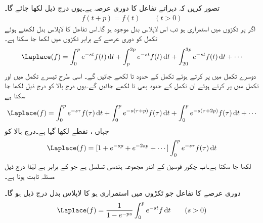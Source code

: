 تصور کریں کہ دہراتے تفاعل  کا دوری عرصہ  ہے۔یوں درج ذیل لکھا جائے گا۔
\begin{align}
f(t+p)=f(t)\quad \quad (t>0)
\end{align}
اگر  پر  ٹکڑوں میں استمراری ہو تب اس لاپلاس بدل موجود ہو گا۔اس تفاعل کا لاپلاس بدل  لکھتے ہوئے تکمل کو دوری عرصے کے برابر ٹکڑوں میں لکھا جا سکتا ہے۔
\begin{align*}
\Laplace(f)=\int_{0}^{p}e^{-st}f(t)\dif t+\int_{p}^{2p}e^{-st}f(t)\dif t+\int_{20}^{3p}e^{-st}f(t)\dif t+\cdots
\end{align*}     
دوسرے تکمل میں  پر کرتے ہوئے تکمل کے حدود  تا  لکھے جائیں گے۔ اسی طرح تیسرے تکمل میں  اور   تکمل میں  پر کرتے ہوئے ان تکمل کے حدود بھی  تا  لکھے جائیں گے۔یوں درج بالا کو درج ذیل لکھا جا سکتا ہے
\begin{align*}
\Laplace(f)=\int_{0}^{p}e^{-s\tau}f(\tau)\dif t+\int_{0}^{p}e^{-s(\tau+p)}f(\tau)\dif t+\int_{0}^{p}e^{-s(\tau+2p)}f(\tau)\dif t+\cdots
\end{align*}   
جہاں ،  نقطے لکھا گیا ہے۔درج بالا کو
\begin{align*}
\Laplace(f)=[1+e^{-sp}+e^{-2sp}+\cdots]\int_{0}^{p}e^{-s\tau}f(\tau)\dif t
\end{align*}   
لکھا جا سکتا ہے۔اب چکور قوسین کے اندر مجموعہ ہندسی تسلسل ہے جو  کے برابر ہے  لہٰذا درج ذیل مسئلہ ثابت ہوتا ہے۔

 دوری عرصے کا تفاعل  جو ٹکڑوں میں استمراری ہو کا لاپلاس بدل درج ذیل ہو گا۔ 
\begin{align}\label{مساوات_مسئلہ_لاپلاس_دہراتا_تفاعل}
\Laplace(f)=\frac{1}{1-e^{-ps}}\int_{0}^{p}e^{-st}f\dif t\quad \quad (s>0)
\end{align}

